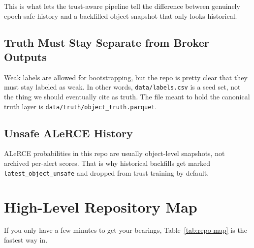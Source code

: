 \documentclass[11pt]{article}
\newcommand{\code}[1]{\texttt{#1}}
\begin{document}
This is what lets the trust-aware pipeline tell the difference between genuinely epoch-safe history and a backfilled object snapshot that only looks historical.

\subsection{Truth Must Stay Separate from Broker Outputs}

Weak labels are allowed for bootstrapping, but the repo is pretty clear that they must stay labeled as weak. In other words, \code{data/labels.csv} is a seed set, not the thing we should eventually cite as truth. The file meant to hold the canonical truth layer is \code{data/truth/object\_truth.parquet}.

\subsection{Unsafe ALeRCE History}

ALeRCE probabilities in this repo are usually object-level snapshots, not archived per-alert scores. That is why historical backfills get marked \code{latest\_object\_unsafe} and dropped from trust training by default.

\section{High-Level Repository Map}

If you only have a few minutes to get your bearings, Table~\ref{tab:repo-map} is the fastest way in.
\end{document}
